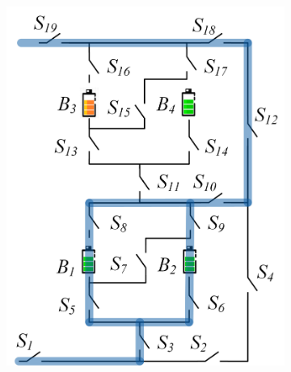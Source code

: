 \documentclass{article}
\begin{document}
\begin{figure}[htbp]
    \centering
    \begin{subfigure}[b]{0.31\textwidth}
        \includegraphics[width=\textwidth]{e2f2-isolate-1.png}
        \caption{}
        \label{fig:my-isolated-1}
    \end{subfigure}
    \hspace{0.02\textwidth}
    \begin{subfigure}[b]{0.31\textwidth}

\end{subfigure}
\end{figure}
\end{document}
